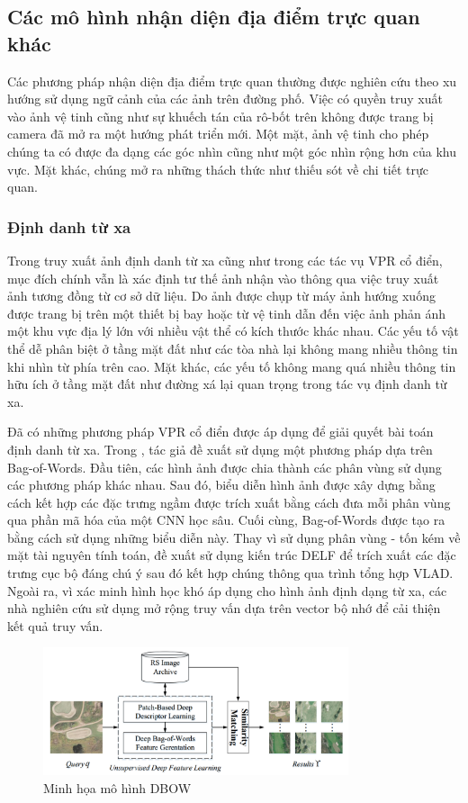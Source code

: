 \subsection{Các mô hình nhận diện địa điểm trực quan khác}
Các phương pháp nhận diện địa điểm trực quan thường được nghiên cứu theo xu hướng sử dụng ngữ cảnh của các ảnh trên đường phố. Việc có quyền truy xuất vào ảnh vệ tinh cũng như sự khuếch tán của rô-bốt trên không được trang bị camera đã mở ra một hướng phát triển mới. Một mặt, ảnh vệ tinh cho phép chúng ta có được đa dạng các góc nhìn cũng như một góc nhìn rộng hơn của khu vực. Mặt khác, chúng mở ra những thách thức như thiếu sót về chi tiết trực quan.

\subsubsection{Định danh từ xa}
Trong truy xuất ảnh định danh từ xa cũng như trong các tác vụ VPR cổ điển, mục đích chính vẫn là xác định tư thế ảnh nhận vào thông qua việc truy xuất ảnh tương đồng từ cơ sở dữ liệu. Do ảnh được chụp từ máy ảnh hướng xuống được trang bị trên một thiết bị bay hoặc từ vệ tinh dẫn đến việc ảnh phản ánh một khu vực địa lý lớn với nhiều vật thể có kích thước khác nhau. Các yếu tố vật thể dễ phân biệt ở tầng mặt đất như các tòa nhà lại không mang nhiều thông tin khi nhìn từ phía trên cao. Mặt khác, các yếu tố không mang quá nhiều thông tin hữu ích ở tầng mặt đất như đường xá lại quan trọng trong tác vụ định danh từ xa.

Đã có những phương pháp VPR cổ điển được áp dụng để giải quyết bài toán định danh từ xa. Trong \cite{Tang2018UnsupervisedDF}, tác giả đề xuất sử dụng một phương pháp dựa trên Bag-of-Words. Đầu tiên, các hình ảnh được chia thành các phân vùng sử dụng các phương pháp khác nhau. Sau đó, biểu diễn hình ảnh được xây dựng bằng cách kết hợp các đặc trưng ngầm được trích xuất bằng cách đưa mỗi phân vùng qua phần mã hóa của một CNN học sâu. Cuối cùng, Bag-of-Words được tạo ra bằng cách sử dụng những biểu diễn này. Thay vì sử dụng phân vùng - tốn kém về mặt tài nguyên tính toán, \cite{Imbriaco_2019} đề xuất sử dụng kiến trúc DELF để trích xuất các đặc trưng cục bộ đáng chú ý sau đó kết hợp chúng thông qua trình tổng hợp VLAD. Ngoài ra, vì xác minh hình học khó áp dụng cho hình ảnh định dạng từ xa, các nhà nghiên cứu sử dụng mở rộng truy vấn dựa trên vector bộ nhớ \cite{7870636} để cải thiện kết quả truy vấn.

\begin{figure}[H]
    \centering
    \includegraphics[width=0.8\textwidth]{pics/Chapter2/rsir.png}
    \caption{Minh họa mô hình DBOW \cite{Tang2018UnsupervisedDF}}
\end{figure}

